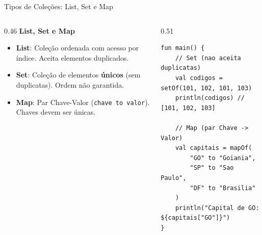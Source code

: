 \documentclass[aspectratio=169]{beamer}
\begin{document}
\begin{frame}[fragile]{Tipos de Coleções: List, Set e Map}
  \begin{columns}[T]
    \begin{column}{0.46\textwidth}
      \textbf{List, Set e Map}
      \vspace{0.3em}
      \begin{itemize}\small
        \item \textbf{List}: Coleção ordenada com acesso por índice. Aceita elementos duplicados.
        \item \textbf{Set}: Coleção de elementos \textbf{únicos} (sem duplicatas). Ordem não garantida.
        \item \textbf{Map}: Par Chave-Valor (\texttt{chave to valor}). Chaves devem ser únicas.
      \end{itemize}
    \end{column}
    \begin{column}{0.51\textwidth}
\begin{lstlisting}[style=KotlinStyle]
fun main() {
    // Set (nao aceita duplicatas)
    val codigos = setOf(101, 102, 101, 103)
    println(codigos) // [101, 102, 103]

    // Map (par Chave -> Valor)
    val capitais = mapOf(
        "GO" to "Goiania",
        "SP" to "Sao Paulo",
        "DF" to "Brasilia"
    )
    println("Capital de GO: ${capitais["GO"]}")
}
\end{lstlisting}
    \end{column}
  \end{columns}
\end{frame}
\end{document}
